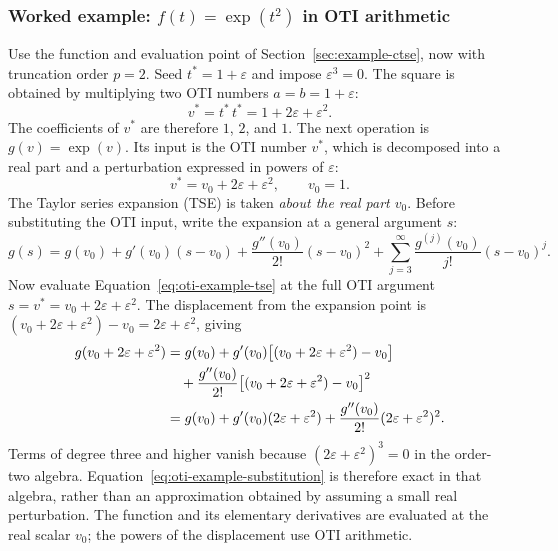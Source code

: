\documentclass[10pt]{article}
\begin{document}
\subsubsection{Worked example: \texorpdfstring{$f(t)=\exp(t^2)$}{f(t) = exp(t squared)} in OTI arithmetic}
\label{sec:example-oti}
Use the function and evaluation point of Section~\ref{sec:example-ctse}, now
with truncation order $p=2$. Seed $t^*=1+\varepsilon$ and impose $\varepsilon^3=0$. The square is obtained by
multiplying two OTI numbers $a=b=1+\varepsilon$:
\[
 v^*=t^*\,t^*=1+2\varepsilon+\varepsilon^2.
\]
The coefficients of $v^*$ are therefore $1$, $2$, and $1$. The next operation
is $g(v)=\exp(v)$. Its input is the OTI number $v^*$, which is decomposed
into a real part and a perturbation expressed in powers of $\varepsilon$:
\begin{equation}
\label{eq:oti-example-real-part}
 v^*=v_0+2\varepsilon+\varepsilon^2,\qquad v_0=1.
\end{equation}
The Taylor series expansion (TSE) is taken \emph{about the real part $v_0$}.
Before substituting the OTI input, write the expansion at a general argument $s$:
\begin{equation}
\label{eq:oti-example-tse}
 g(s)=g(v_0)+g'(v_0)(s-v_0)
       +\frac{g''(v_0)}{2!}(s-v_0)^2
       +\sum_{j=3}^{\infty}\frac{g^{(j)}(v_0)}{j!}(s-v_0)^j.
\end{equation}
Now evaluate Equation~\eqref{eq:oti-example-tse} at the full OTI argument
$s=v^*=v_0+2\varepsilon+\varepsilon^2$. The displacement from the
expansion point is $(v_0+2\varepsilon+\varepsilon^2)-v_0=2\varepsilon+\varepsilon^2$,
giving
\begin{align}
 g(v_0+2\varepsilon+\varepsilon^2)
 &=g(v_0)+g'(v_0)\bigl[(v_0+2\varepsilon+\varepsilon^2)-v_0\bigr]\notag\\
 &\quad+\frac{g''(v_0)}{2!}\bigl[(v_0+2\varepsilon+\varepsilon^2)-v_0\bigr]^2\notag\\
 &=g(v_0)+g'(v_0)(2\varepsilon+\varepsilon^2)
   +\frac{g''(v_0)}{2!}(2\varepsilon+\varepsilon^2)^2.
 \label{eq:oti-example-substitution}
\end{align}
Terms of degree three and higher vanish because
$(2\varepsilon+\varepsilon^2)^3=0$ in the order-two
algebra. Equation~\eqref{eq:oti-example-substitution} is therefore exact in that
algebra, rather than an approximation obtained by assuming a small real
perturbation. The function and its elementary derivatives are evaluated at the
real scalar $v_0$; the powers of the displacement use OTI arithmetic.
\end{document}
